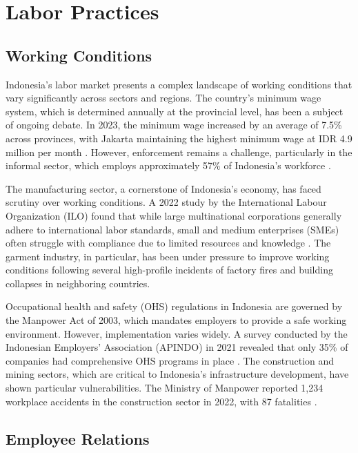 \section{Labor Practices}

\subsection{Working Conditions}

Indonesia's labor market presents a complex landscape of working conditions that vary significantly across sectors and regions. The country's minimum wage system, which is determined annually at the provincial level, has been a subject of ongoing debate. In 2023, the minimum wage increased by an average of 7.5\% across provinces, with Jakarta maintaining the highest minimum wage at IDR 4.9 million per month \cite{ref1}. However, enforcement remains a challenge, particularly in the informal sector, which employs approximately 57\% of Indonesia's workforce \cite{ref2}.

The manufacturing sector, a cornerstone of Indonesia's economy, has faced scrutiny over working conditions. A 2022 study by the International Labour Organization (ILO) found that while large multinational corporations generally adhere to international labor standards, small and medium enterprises (SMEs) often struggle with compliance due to limited resources and knowledge \cite{ref3}. The garment industry, in particular, has been under pressure to improve working conditions following several high-profile incidents of factory fires and building collapses in neighboring countries.

Occupational health and safety (OHS) regulations in Indonesia are governed by the Manpower Act of 2003, which mandates employers to provide a safe working environment. However, implementation varies widely. A survey conducted by the Indonesian Employers' Association (APINDO) in 2021 revealed that only 35\% of companies had comprehensive OHS programs in place \cite{ref4}. The construction and mining sectors, which are critical to Indonesia's infrastructure development, have shown particular vulnerabilities. The Ministry of Manpower reported 1,234 workplace accidents in the construction sector in 2022, with 87 fatalities \cite{ref5}.

\subsection{Employee Relations}

